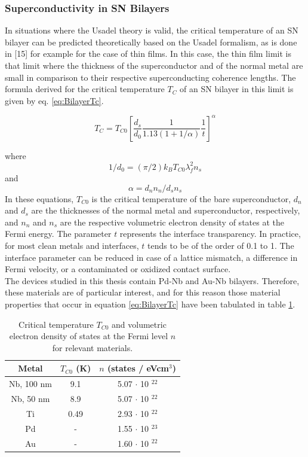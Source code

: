 \subsubsection{Superconductivity in SN Bilayers}
In situations where the Usadel theory is valid, the critical temperature of an SN bilayer can be predicted theoretically based on the Usadel formalism, as is done in [15] for example for the case of thin films. In this case, the thin film limit is that limit where the thickness of the superconductor and of the normal metal are small in comparison to their respective superconducting coherence lengths. The formula derived for the critical temperature $T_C$ of an SN bilayer in this limit is given by eq. \ref{eq:BilayerTc}.

\begin{equation}
\label{eq:BilayerTc}
T_C = T_{C0} \left[ \frac{d_s}{d_0} \frac{1}{1.13(1+1/\alpha)} \frac{1}{t} \right] ^\alpha
\end{equation}

\noindent where $$ 1/d_0 = (\pi/2)k_BT_{C0}\lambda_f^2n_s $$ and $$ \alpha = d_nn_n/d_sn_s $$ In these equations, $T_{C0}$ is the critical temperature of the bare superconductor, $d_n$ and $d_s$ are the thicknesses of the normal metal and superconductor, respectively, and $n_n$ and $n_s$ are the respective volumetric electron density of states at the Fermi energy. The parameter $t$ represents the interface transparency. In practice, for most clean metals and interfaces, $t$ tends to be of the order of 0.1 to 1. The interface parameter can be reduced in case of a lattice mismatch, a difference in Fermi velocity, or a contaminated or oxidized contact surface.\\

The devices studied in this thesis contain Pd-Nb and Au-Nb bilayers. Therefore, these materials are of particular interest, and for this reason those material properties that occur in equation \ref{eq:BilayerTc} have been tabulated in table \ref{tab:Bilayer_Table}.

\begin{table}[H]
\centering
\caption{Critical temperature $T_{C0}$ and volumetric electron density of states at the Fermi level $n$ for relevant materials.}
\label{tab:Bilayer_Table}
\begin{tabular}{|c|c|c|}

\hline 
Metal & $T_{C0}$ (K) & $n$ (states / eVcm$^3$) \\ 
\hline 
Nb, 100 nm & 9.1  & 5.07 $\cdot$ 10 $^{22}$ \\ 
\hline 
Nb, 50 nm & 8.9 & 5.07 $\cdot$ 10 $^{22}$ \\ 
\hline 
Ti & 0.49  & 2.93 $\cdot$ 10 $^{22}$ \\ 
\hline 
Pd & - & 1.55 $\cdot$ 10 $^{23}$ \\ 
\hline 
Au & - & 1.60 $\cdot$ 10 $^{22}$ \\ 
\hline 
\end{tabular} 
\end{table}

